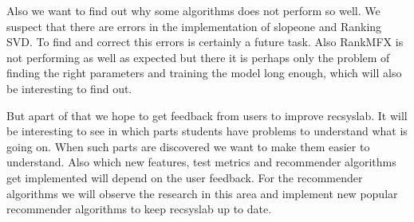Also we want to find out why some algorithms does not perform so well.
We suspect that there are errors in the implementation of slopeone and
Ranking SVD. To find and correct this errors is certainly a future task.
Also RankMFX is not performing as well as expected but there it is 
perhaps only the problem of finding the right parameters and training
the model long enough, which will also be interesting to find out.

But apart of that we hope to get feedback from users to improve recsyslab.
It will be interesting to see in which parts students have problems to 
understand what is going on. When such parts are discovered we want to make
them easier to understand. Also which new features, test metrics and recommender algorithms
get implemented will depend on the user feedback. For the recommender algorithms
we will observe the research in this area and implement new popular recommender algorithms
to keep recsyslab up to date.
